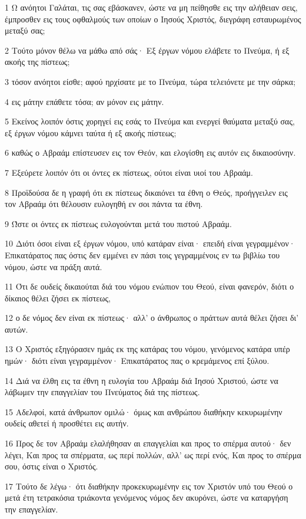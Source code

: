 \par 1 Ω ανόητοι Γαλάται, τις σας εβάσκανεν, ώστε να μη πείθησθε εις την αλήθειαν σεις, έμπροσθεν εις τους οφθαλμούς των οποίων ο Ιησούς Χριστός, διεγράφη εσταυρωμένος μεταξύ σας;
\par 2 Τούτο μόνον θέλω να μάθω από σάς· Εξ έργων νόμου ελάβετε το Πνεύμα, ή εξ ακοής της πίστεως;
\par 3 τόσον ανόητοι είσθε; αφού ηρχίσατε με το Πνεύμα, τώρα τελειόνετε με την σάρκα;
\par 4 εις μάτην επάθετε τόσα; αν μόνον εις μάτην.
\par 5 Εκείνος λοιπόν όστις χορηγεί εις εσάς το Πνεύμα και ενεργεί θαύματα μεταξύ σας, εξ έργων νόμου κάμνει ταύτα ή εξ ακοής πίστεως;
\par 6 καθώς ο Αβραάμ επίστευσεν εις τον Θεόν, και ελογίσθη εις αυτόν εις δικαιοσύνην.
\par 7 Εξεύρετε λοιπόν ότι οι όντες εκ πίστεως, ούτοι είναι υιοί του Αβραάμ.
\par 8 Προϊδούσα δε η γραφή ότι εκ πίστεως δικαιόνει τα έθνη ο Θεός, προήγγειλεν εις τον Αβραάμ ότι θέλουσιν ευλογηθή εν σοι πάντα τα έθνη.
\par 9 Ώστε οι όντες εκ πίστεως ευλογούνται μετά του πιστού Αβραάμ.
\par 10 Διότι όσοι είναι εξ έργων νόμου, υπό κατάραν είναι· επειδή είναι γεγραμμένον· Επικατάρατος πας όστις δεν εμμένει εν πάσι τοις γεγραμμένοις εν τω βιβλίω του νόμου, ώστε να πράξη αυτά.
\par 11 Ότι δε ουδείς δικαιούται διά του νόμου ενώπιον του Θεού, είναι φανερόν, διότι ο δίκαιος θέλει ζήσει εκ πίστεως,
\par 12 ο δε νόμος δεν είναι εκ πίστεως· αλλ' ο άνθρωπος ο πράττων αυτά θέλει ζήσει δι' αυτών.
\par 13 Ο Χριστός εξηγόρασεν ημάς εκ της κατάρας του νόμου, γενόμενος κατάρα υπέρ ημών· διότι είναι γεγραμμένον· Επικατάρατος πας ο κρεμάμενος επί ξύλου.
\par 14 Διά να έλθη εις τα έθνη η ευλογία του Αβραάμ διά Ιησού Χριστού, ώστε να λάβωμεν την επαγγελίαν του Πνεύματος διά της πίστεως.
\par 15 Αδελφοί, κατά άνθρωπον ομιλώ· όμως και ανθρώπου διαθήκην κεκυρωμένην ουδείς αθετεί ή προσθέτει εις αυτήν.
\par 16 Προς δε τον Αβραάμ ελαλήθησαν αι επαγγελίαι και προς το σπέρμα αυτού· δεν λέγει, Και προς τα σπέρματα, ως περί πολλών, αλλ' ως περί ενός, Και προς το σπέρμα σου, όστις είναι ο Χριστός.
\par 17 Τούτο δε λέγω· ότι διαθήκην προκεκυρωμένην εις τον Χριστόν υπό του Θεού ο μετά έτη τετρακόσια τριάκοντα γενόμενος νόμος δεν ακυρόνει, ώστε να καταργήση την επαγγελίαν.
